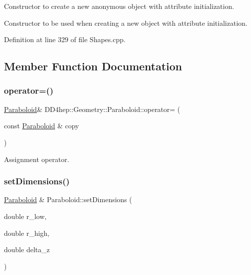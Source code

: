 Constructor to create a new anonymous object with attribute initialization. 

Constructor to be used when creating a new object with attribute initialization. 

Definition at line 329 of file Shapes.\+cpp.



\subsection{Member Function Documentation}
\hypertarget{class_d_d4hep_1_1_geometry_1_1_paraboloid_a981fe7239f96a7dc0ced368d64daa51b}{}\label{class_d_d4hep_1_1_geometry_1_1_paraboloid_a981fe7239f96a7dc0ced368d64daa51b} 
\subsubsection{\texorpdfstring{operator=()}{operator=()}}
{\footnotesize\ttfamily \hyperlink{class_d_d4hep_1_1_geometry_1_1_paraboloid}{Paraboloid}\& D\+D4hep\+::\+Geometry\+::\+Paraboloid\+::operator= (\begin{DoxyParamCaption}\item[{const \hyperlink{class_d_d4hep_1_1_geometry_1_1_paraboloid}{Paraboloid} \&}]{copy }\end{DoxyParamCaption})\hspace{0.3cm}{\ttfamily [default]}}



Assignment operator. 

\hypertarget{class_d_d4hep_1_1_geometry_1_1_paraboloid_ac05a503afc384dfc0fc882465e9e43df}{}\label{class_d_d4hep_1_1_geometry_1_1_paraboloid_ac05a503afc384dfc0fc882465e9e43df} 
\subsubsection{\texorpdfstring{set\+Dimensions()}{setDimensions()}}
{\footnotesize\ttfamily \hyperlink{class_d_d4hep_1_1_geometry_1_1_paraboloid}{Paraboloid} \& Paraboloid\+::set\+Dimensions (\begin{DoxyParamCaption}\item[{double}]{r\+\_\+low,  }\item[{double}]{r\+\_\+high,  }\item[{double}]{delta\+\_\+z }\end{DoxyParamCaption})}



